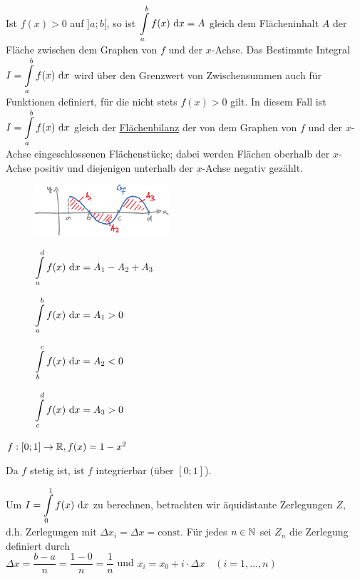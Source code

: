 \Bem Ist $f(x)>0$ auf $]a;b[$, so ist $\displaystyle\int\limits_{a}^{b}f(x)\ \mathrm{d}x=A$ gleich dem Flächeninhalt $A$ der Fläche zwischen dem Graphen von $f$ und der $x$-Achse.
Das Bestimmte Integral $I=\displaystyle\int\limits_{a}^{b}f(x)\ \mathrm{d}x$ wird über den Grenzwert von Zwischensummen auch für Funktionen definiert, für die nicht stets $f(x)>0$ gilt. In diesem Fall ist $I=\displaystyle\int\limits_{a}^{b}f(x)\ \mathrm{d}x$ gleich der \ul{Flächenbilanz} der von dem Graphen von $f$ und der $x$-Achse eingeschlossenen Flächenstücke; dabei werden Flächen oberhalb der $x$-Achse positiv und diejenigen unterhalb der $x$-Achse negativ gezählt.
\begin{figure}[h!]
	\begin{minipage}{0.6\linewidth}
		\centering\includegraphics[width=5cm]{Bilder/221}
		\caption{}
		
		$\displaystyle\int\limits_{a}^{d}f(x)\ \mathrm{d}x=A_1-A_2+A_3$
	\end{minipage}
	\begin{minipage}{0.35\linewidth}
		$\displaystyle\int\limits_{a}^{b}f(x)\ \mathrm{d}x=A_1>0$

		$\displaystyle\int\limits_{b}^{c}f(x)\ \mathrm{d}x=A_2<0$

		$\displaystyle\int\limits_{c}^{d}f(x)\ \mathrm{d}x=A_3>0$
	\end{minipage}
\end{figure}


\Bsp $f:[0;1]\to\mathbb{R}, f(x)=1-x^2$

Da $f$ stetig ist, ist $f$ integrierbar (über $[0;1]$).

Um $I=\displaystyle\int\limits_{0}^{1}f(x)\ \mathrm{d}x$ zu berechnen, betrachten wir äquidistante Zerlegungen $Z$, d.h. Zerlegungen mit $\Delta x_i=\Delta x=\text{const.}$ Für jedes $n\in\mathbb{N}$ sei $Z_n$ die Zerlegung definiert durch\\
$\Delta x=\dfrac{b-a}{n}=\dfrac{1-0}{n}=\dfrac{1}{n}$ und $x_i=x_0+i\cdot\Delta x\quad(i=1,\ldots,n)$


